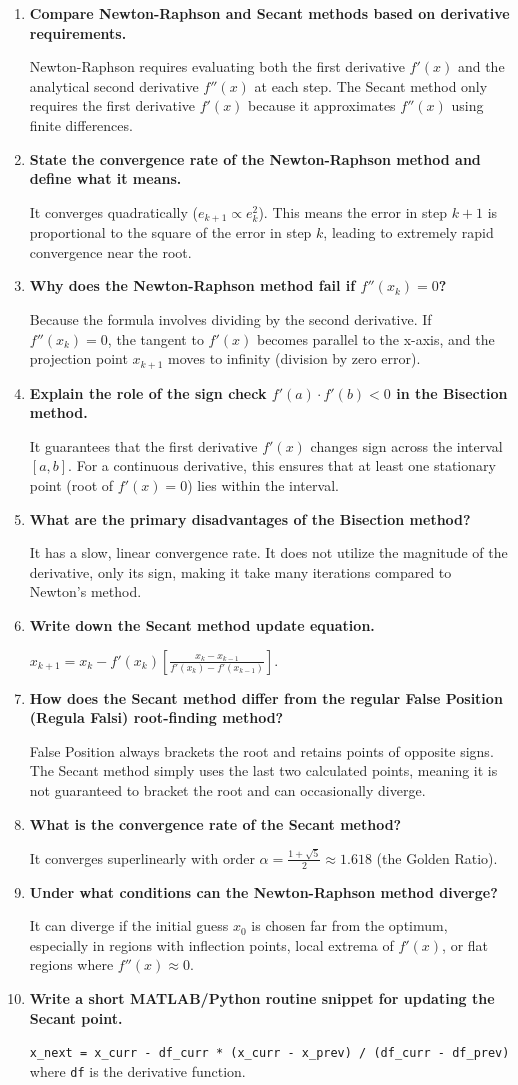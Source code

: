 \documentclass[12pt,a4paper]{article}
\newcommand{\Q}[1]{\textbf{#1}\par\noindent\ignorespaces}
\begin{document}
\begin{tcolorbox}[exambox, title={\textbf{Frequently Asked / Viva Questions}}]
\begin{enumerate}[topsep=0pt, label=\textbf{Q\arabic*.}, itemsep=5pt]
  \item \Q{Compare Newton-Raphson and Secant methods based on derivative requirements.}
    Newton-Raphson requires evaluating both the first derivative $f'(x)$ and the analytical second derivative $f''(x)$ at each step. The Secant method only requires the first derivative $f'(x)$ because it approximates $f''(x)$ using finite differences.
  \item \Q{State the convergence rate of the Newton-Raphson method and define what it means.}
    It converges quadratically ($e_{k+1} \propto e_k^2$). This means the error in step $k+1$ is proportional to the square of the error in step $k$, leading to extremely rapid convergence near the root.
  \item \Q{Why does the Newton-Raphson method fail if $f''(x_k) = 0$?}
    Because the formula involves dividing by the second derivative. If $f''(x_k) = 0$, the tangent to $f'(x)$ becomes parallel to the x-axis, and the projection point $x_{k+1}$ moves to infinity (division by zero error).
  \item \Q{Explain the role of the sign check $f'(a) \cdot f'(b) < 0$ in the Bisection method.}
    It guarantees that the first derivative $f'(x)$ changes sign across the interval $[a, b]$. For a continuous derivative, this ensures that at least one stationary point (root of $f'(x)=0$) lies within the interval.
  \item \Q{What are the primary disadvantages of the Bisection method?}
    It has a slow, linear convergence rate. It does not utilize the magnitude of the derivative, only its sign, making it take many iterations compared to Newton's method.
  \item \Q{Write down the Secant method update equation.}
    $x_{k+1} = x_k - f'(x_k) \left[ \frac{x_k - x_{k-1}}{f'(x_k) - f'(x_{k-1})} \right]$.
  \item \Q{How does the Secant method differ from the regular False Position (Regula Falsi) root-finding method?}
    False Position always brackets the root and retains points of opposite signs. The Secant method simply uses the last two calculated points, meaning it is not guaranteed to bracket the root and can occasionally diverge.
  \item \Q{What is the convergence rate of the Secant method?}
    It converges superlinearly with order $\alpha = \frac{1+\sqrt{5}}{2} \approx 1.618$ (the Golden Ratio).
  \item \Q{Under what conditions can the Newton-Raphson method diverge?}
    It can diverge if the initial guess $x_0$ is chosen far from the optimum, especially in regions with inflection points, local extrema of $f'(x)$, or flat regions where $f''(x) \approx 0$.
  \item \Q{Write a short MATLAB/Python routine snippet for updating the Secant point.}
    \verb|x_next = x_curr - df_curr * (x_curr - x_prev) / (df_curr - df_prev)| where \verb|df| is the derivative function.
\end{enumerate}
\end{tcolorbox}
\end{document}
